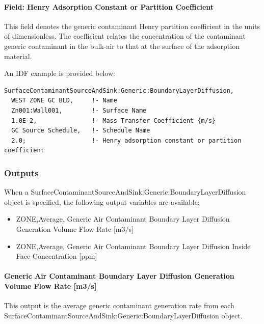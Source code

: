 \paragraph{Field: Henry Adsorption Constant or Partition Coefficient}\label{field-henry-adsorption-constant-or-partition-coefficient}

This field denotes the generic contaminant Henry partition coefficient in the units of dimensionless. The coefficient relates the concentration of the contaminant generic contaminant in the bulk-air to that at the surface of the adsorption material.

An IDF example is provided below:

\begin{lstlisting}
SurfaceContaminantSourceAndSink:Generic:BoundaryLayerDiffusion,
  WEST ZONE GC BLD,     !- Name
  Zn001:Wall001,        !- Surface Name
  1.0E-2,               !- Mass Transfer Coefficient {m/s}
  GC Source Schedule,   !- Schedule Name
  2.0;                  !- Henry adsorption constant or partition coefficient
\end{lstlisting}

\subsubsection{Outputs}\label{outputs-11-003}

When a Sur\-face\-Con\-taminant\-Source\-And\-Sink:\-Generic:\-Boundary\-Layer\-Diffusion object is specified, the following output variables are available:

\begin{itemize}
  \tightlist
  \item
    ZONE,Average, Generic Air Contaminant Boundary Layer Diffusion Generation Volume Flow Rate {[}m3/s{]}
  \item
    ZONE,Average, Generic Air Contaminant Boundary Layer Diffusion Inside Face Concentration {[}ppm{]}
\end{itemize}

\paragraph{Generic Air Contaminant Boundary Layer Diffusion Generation Volume Flow Rate {[}m3/s{]}}\label{generic-air-contaminant-boundary-layer-diffusion-generation-volume-flow-rate-m3s}

This output is the average generic contaminant generation rate from each Sur\-face\-Contaminant\-Source\-And\-Sink:\-Generic:\-Boundary\-Layer\-Diffusion object.


